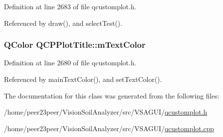 Definition at line 2683 of file qcustomplot.\+h.



Referenced by draw(), and select\+Test().

\hypertarget{class_q_c_p_plot_title_a5d7f834d6522c1a72fb0682c0b7ebe13}{}
\subsubsection[{m\+Text\+Color}]{\setlength{\rightskip}{0pt plus 5cm}Q\+Color Q\+C\+P\+Plot\+Title\+::m\+Text\+Color\hspace{0.3cm}{\ttfamily [protected]}}\label{class_q_c_p_plot_title_a5d7f834d6522c1a72fb0682c0b7ebe13}


Definition at line 2680 of file qcustomplot.\+h.



Referenced by main\+Text\+Color(), and set\+Text\+Color().



The documentation for this class was generated from the following files\+:\begin{DoxyCompactItemize}
\item 
/home/peer23peer/\+Vision\+Soil\+Analyzer/src/\+V\+S\+A\+G\+U\+I/\hyperlink{qcustomplot_8h}{qcustomplot.\+h}\item 
/home/peer23peer/\+Vision\+Soil\+Analyzer/src/\+V\+S\+A\+G\+U\+I/\hyperlink{qcustomplot_8cpp}{qcustomplot.\+cpp}\end{DoxyCompactItemize}
